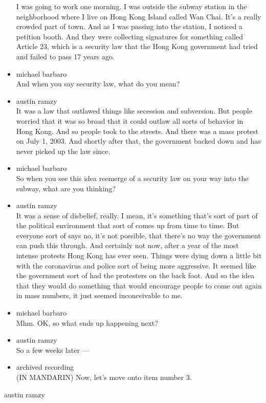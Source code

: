 \begin{itemize}
  I was going to work one morning. I was outside the subway station in
  the neighborhood where I live on Hong Kong Island called Wan Chai.
  It's a really crowded part of town. And as I was passing into the
  station, I noticed a petition booth. And they were collecting
  signatures for something called Article 23, which is a security law
  that the Hong Kong government had tried and failed to pass 17 years
  ago.
\item
  michael barbaro\\
  And when you say security law, what do you mean?
\item
  austin ramzy\\
  It was a law that outlawed things like secession and subversion. But
  people worried that it was so broad that it could outlaw all sorts of
  behavior in Hong Kong. And so people took to the streets. And there
  was a mass protest on July 1, 2003. And shortly after that, the
  government backed down and has never picked up the law since.
\item
  michael barbaro\\
  So when you see this idea reemerge of a security law on your way into
  the subway, what are you thinking?
\item
  austin ramzy\\
  It was a sense of disbelief, really. I mean, it's something that's
  sort of part of the political environment that sort of comes up from
  time to time. But everyone sort of says no, it's not possible, that
  there's no way the government can push this through. And certainly not
  now, after a year of the most intense protests Hong Kong has ever
  seen. Things were dying down a little bit with the coronavirus and
  police sort of being more aggressive. It seemed like the government
  sort of had the protesters on the back foot. And so the idea that they
  would do something that would encourage people to come out again in
  mass numbers, it just seemed inconceivable to me.
\item
  michael barbaro\\
  Mhm. OK, so what ends up happening next?
\item
  austin ramzy\\
  So a few weeks later ---
\item
  archived recording\\
  (IN MANDARIN) Now, let's move onto item number 3.
\end{itemize}

austin ramzy

